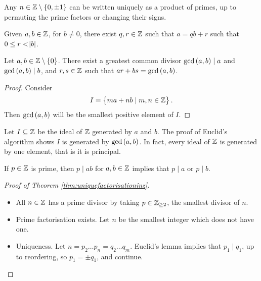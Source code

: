 \begin{theorem}
\label{thm:uniquefactorisationinz}
Any $ n \in \Z \setminus \cbr{0, \pm 1} $ can be written uniquely as a product of primes, up to permuting the prime factors or changing their signs.
\end{theorem}

\begin{proposition}
Given $ a, b \in \mathbb{Z} $, for $ b \ne 0 $, there exist $ q, r \in \mathbb{Z} $ such that $ a = qb + r $ such that $ 0 \le r < \abs{b} $.
\end{proposition}

\begin{proposition}
Let $ a, b \in \Z \setminus \cbr{0} $. There exist a greatest common divisor $ \gcd\br{a, b} \mid a $ and $ \gcd\br{a, b} \mid b $, and $ r, s \in \mathbb{Z} $ such that $ ar + bs = \gcd\br{a, b} $.
\end{proposition}

\begin{proof}
Consider
$$ I = \cbr{ma + nb \mid m, n \in \Z}. $$
Then $ \gcd\br{a, b} $ will be the smallest positive element of $ I $.
\end{proof}

Let $ I \subseteq \mathbb{Z} $ be the ideal of $ \mathbb{Z} $ generated by $ a $ and $ b $. The proof of Euclid's algorithm shows $ I $ is generated by $ \gcd\br{a, b} $. In fact, every ideal of $ \mathbb{Z} $ is generated by one element, that is it is principal.

\begin{proposition}
If $ p \in \mathbb{Z} $ is prime, then $ p \mid ab $ for $ a, b \in \mathbb{Z} $ implies that $ p \mid a $ or $ p \mid b $.
\end{proposition}

\begin{proof}[Proof of Theorem \ref{thm:uniquefactorisationinz}]
\hfill
\begin{itemize}
\item All $ n \in \mathbb{Z} $ has a prime divisor by taking $ p \in \mathbb{Z}_{\ge 2} $, the smallest divisor of $ n $.
\item Prime factorisation exists. Let $ n $ be the smallest integer which does not have one.
\item Uniqueness. Let $ n = p_2 \dots p_n = q_2 \dots q_m $. Euclid's lemma implies that $ p_1 \mid q_1 $, up to reordering, so $ p_1 = \pm q_1 $, and continue.
\end{itemize}
\end{proof}

